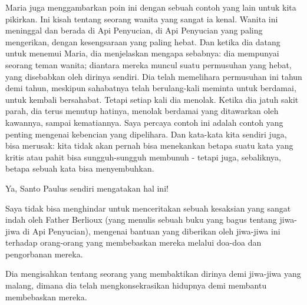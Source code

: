 Maria juga menggambarkan poin ini dengan sebuah contoh yang lain untuk kita pikirkan. Ini kisah tentang seorang wanita yang sangat ia kenal. Wanita ini meninggal dan berada di Api Penyucian, di Api Penyucian yang paling mengerikan, dengan kesengsaraan yang paling hebat. Dan ketika dia datang untuk menemui Maria, dia menjelaskan mengapa sebabnya: dia mempunyai seorang teman wanita; diantara mereka muncul suatu permusuhan yang hebat, yang disebabkan oleh dirinya sendiri. Dia telah memelihara permusuhan ini tahun demi tahun, meskipun sahabatnya telah berulang-kali meminta untuk berdamai, untuk kembali bersahabat. Tetapi setiap kali dia menolak. Ketika dia jatuh sakit parah, dia terus menutup hatinya, menolak berdamai yang ditawarkan oleh kawannya, sampai kematiannya. Saya percaya contoh ini adalah contoh yang penting mengenai kebencian yang dipelihara. Dan kata-kata kita sendiri juga, bisa merusak: kita tidak akan pernah bisa menekankan betapa suatu kata yang kritis atau pahit bisa sungguh-sungguh membunuh - tetapi juga, sebaliknya, betapa sebuah kata bisa menyembuhkan.



Ya, Santo Paulus sendiri mengatakan hal ini!



Saya tidak bisa menghindar untuk menceritakan sebuah kesaksian yang sangat indah oleh Father Berlioux (yang menulis sebuah buku yang bagus tentang jiwa-jiwa di Api Penyucian), mengenai bantuan yang diberikan oleh jiwa-jiwa ini terhadap orang-orang yang membebaskan mereka melalui doa-doa dan pengorbanan mereka.

Dia mengisahkan tentang seorang yang membaktikan dirinya demi jiwa-jiwa yang malang, dimana dia telah mengkonsekrasikan hidupnya demi membantu membebaskan mereka.

